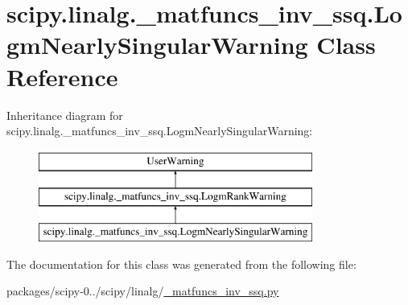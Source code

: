 \hypertarget{classscipy_1_1linalg_1_1__matfuncs__inv__ssq_1_1LogmNearlySingularWarning}{}\section{scipy.\+linalg.\+\_\+matfuncs\+\_\+inv\+\_\+ssq.\+Logm\+Nearly\+Singular\+Warning Class Reference}
\label{classscipy_1_1linalg_1_1__matfuncs__inv__ssq_1_1LogmNearlySingularWarning}
Inheritance diagram for scipy.\+linalg.\+\_\+matfuncs\+\_\+inv\+\_\+ssq.\+Logm\+Nearly\+Singular\+Warning\+:\begin{figure}[H]
\begin{center}
\leavevmode
\includegraphics[height=3.000000cm]{classscipy_1_1linalg_1_1__matfuncs__inv__ssq_1_1LogmNearlySingularWarning}
\end{center}
\end{figure}


The documentation for this class was generated from the following file\+:\begin{DoxyCompactItemize}
\item 
packages/scipy-\/0../scipy/linalg/\hyperlink{__matfuncs__inv__ssq_8py}{\+\_\+matfuncs\+\_\+inv\+\_\+ssq.\+py}\end{DoxyCompactItemize}
